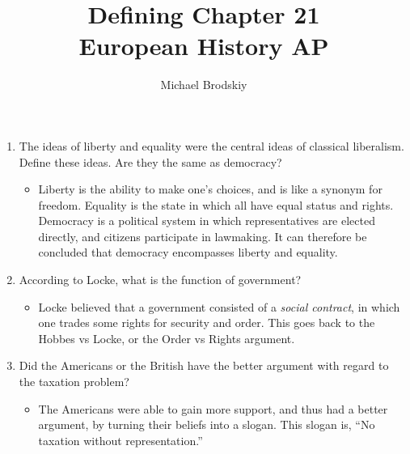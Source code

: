 \documentclass[12pt]{article}
\newcommand{\subtitle}[1]{%
  \posttitle{%
    \par\end{center}
    \begin{center}\large#1\end{center}
    \vskip0.5em}%
}
\begin{document}


\author{Michael Brodskiy}
\title{Defining Chapter 21\\European History AP}
\subtitle{Mrs Fisher}
\maketitle



\begin{enumerate}


\item The ideas of liberty and equality were the central ideas of classical liberalism. Define these ideas. Are they the same as democracy?

	\begin{itemize}
	\item Liberty is the ability to make one's choices, and is like a synonym for freedom. Equality is the state in which all have equal status and rights. Democracy is a political system in which representatives are elected directly, and citizens participate in lawmaking. It can therefore be concluded that democracy encompasses liberty and equality.
	\end{itemize}

\item According to Locke, what is the function of government?

	\begin{itemize}
	\item Locke believed that a government consisted of a \textit{social contract}, in which one trades some rights for security and order. This goes back to the Hobbes vs Locke, or the Order vs Rights argument.
	\end{itemize}

\item Did the Americans or the British have the better argument with regard to the taxation problem?

	\begin{itemize}
	\item The Americans were able to gain more support, and thus had a better argument, by turning their beliefs into a slogan. This slogan is, ``No taxation without representation.''
	\end{itemize}


\end{enumerate}
\end{document}

